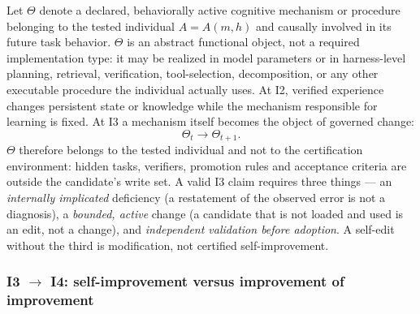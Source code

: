 Let $\Theta$ denote a declared, behaviorally active cognitive mechanism or procedure belonging to the tested individual $A = A(m,h)$ and causally involved in its future task behavior. $\Theta$ is an abstract functional object, not a required implementation type: it may be realized in model parameters or in harness-level planning, retrieval, verification, tool-selection, decomposition, or any other executable procedure the individual actually uses. At I2, verified experience changes persistent state or knowledge while the mechanism responsible for learning is fixed. At I3 a mechanism itself becomes the object of governed change:
\begin{equation}
\Theta_t \longrightarrow \Theta_{t+1}.
\end{equation}
$\Theta$ therefore belongs to the tested individual and not to the certification environment: hidden tasks, verifiers, promotion rules and acceptance criteria are outside the candidate's write set. A valid I3 claim requires three things --- an \emph{internally implicated} deficiency (a restatement of the observed error is not a diagnosis), a \emph{bounded, active} change (a candidate that is not loaded and used is an edit, not a change), and \emph{independent validation before adoption}. A self-edit without the third is modification, not certified self-improvement.

\subsubsection{I3 $\to$ I4: self-improvement versus improvement of improvement}\label{sec:psi}

